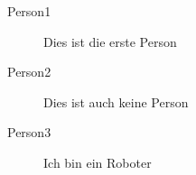 \begin{description}
  \item[Person1] Dies ist die erste Person
  \item[Person2] Dies ist auch keine Person
  \item[Person3] Ich bin ein Roboter
\end{description}
